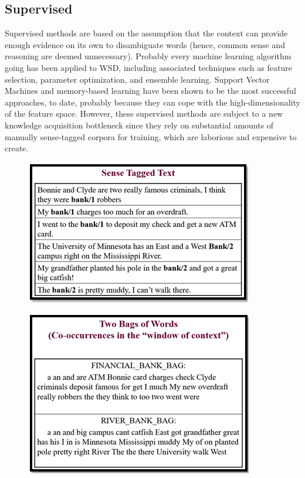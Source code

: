 \subsection*{Supervised}
Supervised methods are based on the assumption that the context can provide enough evidence on its own to disambiguate words (hence, common sense and reasoning are deemed unnecessary). Probably every machine learning algorithm going has been applied to WSD, including associated techniques such as feature selection, parameter optimization, and ensemble learning. Support Vector Machines and memory-based learning have been shown to be the most successful approaches, to date, probably because they can cope with the high-dimensionality of the feature space. However, these supervised methods are subject to a new knowledge acquisition bottleneck since they rely on substantial amounts of manually sense-tagged corpora for training, which are laborious and expensive to create.
\begin{figure}[tbh]
	\begin{center}
		\includegraphics[width=\columnwidth]{union(sup1)}
	\end{center}
\end{figure}
\begin{figure}[tbh]
	\begin{center}
		\includegraphics[width=\columnwidth]{union(sup2)}
	\end{center}
\end{figure}
